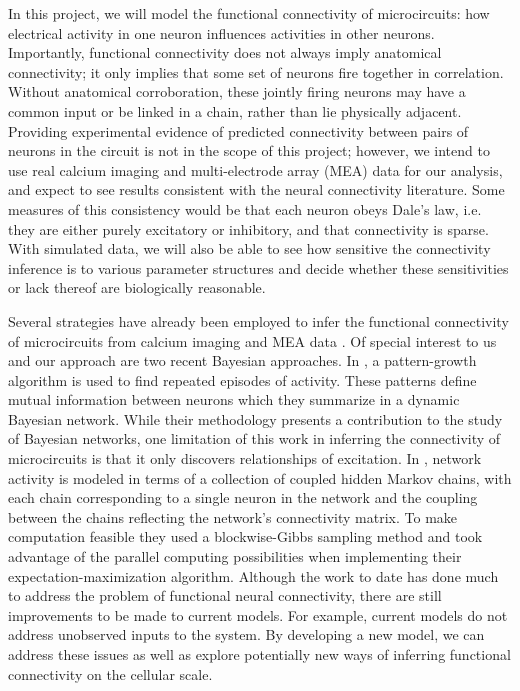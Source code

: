 \documentclass{article}
\begin{document}
In this project, we will model the functional connectivity of
microcircuits: how electrical activity in one neuron influences
activities in other neurons. Importantly, functional connectivity
does not always imply anatomical connectivity; it only implies that
some set of neurons fire together in correlation.  Without anatomical
corroboration, these jointly firing neurons may have a common input
or be linked in a chain, rather than lie physically adjacent.
Providing experimental evidence of predicted connectivity between
pairs of neurons in the circuit is not in the scope of this project;
however, we intend to use real calcium imaging and multi-electrode array (MEA) data for our
analysis, and expect to see results consistent with the neural
connectivity literature.  Some measures of this consistency would
be that each neuron obeys Dale’s law, i.e. they are either
purely excitatory or inhibitory, and that connectivity is sparse.
With simulated data, we will also be able to see how sensitive
the connectivity inference is to various parameter structures and
decide whether these sensitivities or lack thereof are biologically
reasonable.

Several strategies have already been employed to infer the functional
connectivity of microcircuits from calcium imaging and MEA data
\citep{Gerwinn2010, takahashi2007, aguiar2009}. Of special interest to us and our approach
are two recent Bayesian approaches. In \citep{patnaik2011}, 
a pattern-growth algorithm is used to find repeated episodes of
activity. These patterns define mutual information between neurons
which they summarize in a dynamic Bayesian network. While their
methodology presents a contribution to the study of Bayesian networks,
one limitation of this work in inferring the connectivity of
microcircuits is that it only discovers relationships of excitation. In \citep{mishchencko2011}, network activity is modeled in terms of a collection of coupled hidden Markov chains, with each chain
corresponding to a single neuron in the network and the coupling
between the chains reflecting the network’s connectivity matrix.
To make computation feasible they used a blockwise-Gibbs sampling
method and took advantage of the parallel computing possibilities
when implementing their expectation-maximization algorithm. Although the work to date has done much to address the problem of
functional neural connectivity, there are still improvements to be
made to current models. For example, current models do not address
unobserved inputs to the system. By developing a new model, we can address these issues as well as explore potentially new
ways of inferring functional connectivity on the cellular scale. 
\end{document}
